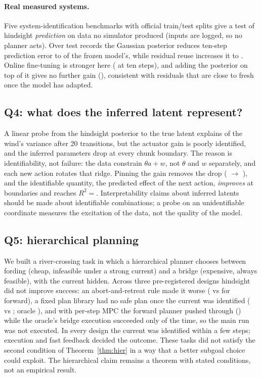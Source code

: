 \documentclass[11pt]{article}
\begin{document}
\paragraph{Real measured systems.} Five system-identification benchmarks \citep{nonlinear_benchmarks} with official
train/test splits give a test of hindsight \emph{prediction} on data no simulator produced (inputs are logged, so no
planner acts). Over \rdRecords{} test records the Gaussian posterior reduces ten-step prediction error to \rdTenStep{} of
the frozen model's, while residual reuse increases it to \rdResidTen. Online fine-tuning is stronger here
(\rdSgdFwdTen{} at ten steps), and adding the posterior on top of it gives no further gain (\rdHybridSgd), consistent
with residuals that are close to fresh once the model has adapted.

\subsection{Q4: what does the inferred latent represent?}
\label{sec:probe}\label{sec:ident}
A linear probe from the hindsight posterior to the true latent explains \idWindTwenty{} of the wind's variance after 20
transitions, but the actuator gain is poorly identified, and the inferred parameters drop at every chunk boundary. The
reason is identifiability, not failure: the data constrain $\theta a+w$, not $\theta$ and $w$ separately, and each new
action rotates that ridge. Pinning the gain removes the drop (\cfDipStd{} $\to$ \cfDipPin), and the identifiable quantity,
the predicted effect of the next action, \emph{improves} at boundaries and reaches $R^2=$\idPredEnd. Interpretability
claims about inferred latents should be made about identifiable combinations; a probe on an unidentifiable coordinate
measures the excitation of the data, not the quality of the model.

\subsection{Q5: hierarchical planning}
\label{sec:hier}
We built a river-crossing task in which a hierarchical planner chooses between fording (cheap, infeasible under a
strong current) and a bridge (expensive, always feasible), with the current hidden. Across three pre-registered designs
hindsight did not improve success: an abort-and-retreat rule made it worse (\rvOneHind{} vs \rvOneFwd{} for forward), a
fixed plan library had no safe plan once the current was identified (\rvTwoHind{} vs \rvTwoFwd; oracle \rvTwoOracle), and
with per-step MPC the forward planner pushed through (\rvThreeFwd) while the oracle's bridge execution succeeded only
\rvThreeOracle{} of the time, so the main run was not executed. In every design the current was identified within a few steps;
execution and fast feedback decided the outcome. These tasks did not satisfy the second condition of
Theorem~\ref{thm:hier} in a way that a better subgoal choice could exploit. The hierarchical claim remains a theorem
with stated conditions, not an empirical result.
\end{document}
